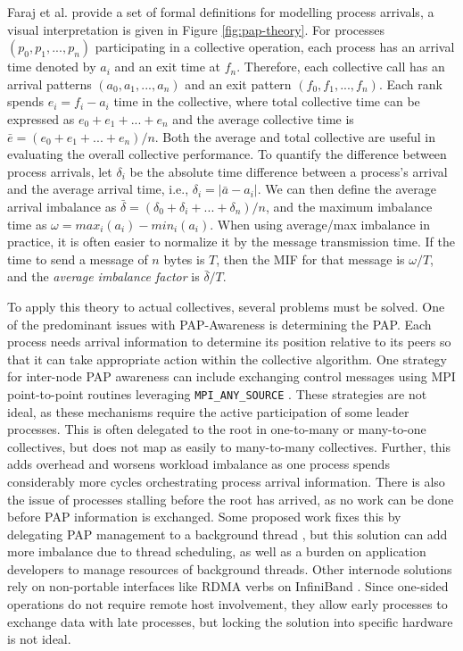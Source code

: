 Faraj et al. \cite{Faraj2008StudyProcArrivalMPIColl} provide a set of formal definitions for modelling process arrivals, a visual interpretation is given in Figure \ref{fig:pap-theory}.
For processes $(p_0, p_1,...,p_n)$ participating in a collective operation, each process has an arrival time denoted by $a_i$ and an exit time at $f_n$.
Therefore, each collective call has an arrival patterns $(a_0, a_1, ..., a_n)$ and an exit pattern $(f_0, f_1, ..., f_n)$.
Each rank spends $e_i = f_i - a_i$ time in the collective, where total collective time can be expressed as $e_0 + e_1 + ... + e_n$ and the average collective time is $\bar{e} = (e_0 + e_1 + ... + e_n)/n$.
Both the average and total collective are useful in evaluating the overall collective performance.
To quantify the difference between process arrivals, let $\delta_i$ be the absolute time difference between a process's arrival and the average arrival time, i.e., $\delta_i = |\bar{a} - a_i|$. 
We can then define the average arrival imbalance as $\bar{\delta}=(\delta_0 + \delta_i + ... + \delta_n)/n$, and the maximum imbalance time as $\omega = max_i(a_i)-min_i(a_i)$.
When using average/max imbalance in practice, it is often easier to normalize it by the message transmission time.
If the time to send a message of $n$ bytes is $T$, then the \gls{MIF} for that message is $\omega/T$, and the \textit{average imbalance factor} is $\bar{\delta}/T$.

To apply this theory to actual collectives, several problems must be solved.
One of the predominant issues with \gls{PAP}-Awareness is determining the \gls{PAP}.
Each process needs arrival information to determine its position relative to its peers so that it can take appropriate action within the collective algorithm. 
One strategy for inter-node \gls{PAP} awareness can include exchanging control messages using \gls{MPI} point-to-point routines leveraging \texttt{MPI\_ANY\_SOURCE} \cite{Patarasuk2008EffBcastDifProcArr}.
These strategies are not ideal, as these mechanisms require the active participation of some leader processes.
This is often delegated to the root in one-to-many or many-to-one collectives, but does not map as easily to many-to-many collectives.
Further, this adds overhead and worsens workload imbalance as one process spends considerably more cycles orchestrating process arrival information.
There is also the issue of processes stalling before the root has arrived, as no work can be done before \gls{PAP} information is exchanged.
Some proposed work fixes this by delegating \gls{PAP} management to a background thread \cite{Proficz2018ImprvAllReduceForImbPAP, Proficz2020PAPAwareScatterGather, Proficz2021AllGatherResilientToImbPAP, Faraj2008StudyProcArrivalMPIColl}, but this solution can add more imbalance due to thread scheduling, as well as a burden on application developers to manage resources of background threads.
Other internode solutions rely on non-portable interfaces like \gls{RDMA} verbs on InfiniBand \cite{Qian2009ProcArrivalSHMA2AIB}.
Since one-sided operations do not require remote host involvement, they allow early processes to exchange data with late processes, but locking the solution into specific hardware is not ideal.

